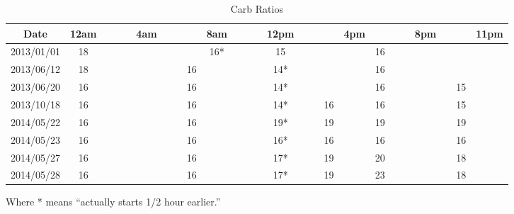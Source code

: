 \begin{table}[h]
\caption{Carb Ratios}
\footnotesize
\begin{center}
\begin{tabular}{|c|c|c|c|c|c|c|c|c|c|c|c|c|c|c|c|c|c|c|c|c|c|c|c|c|}
\hline
Date       & 12am & & & & 4am & & &    & 8am & & & & 12pm & & &    & 4pm &    & & & 8pm & &    & 11pm \\ \hline
2013/01/01 & 18   & & & &     & & &    & 16* & & & & 15   & & &    &     & 16 & & &     & &    &      \\
2013/06/12 & 18   & & & &     & & & 16 &     & & & & 14*  & & &    &     & 16 & & &     & &    &      \\
2013/06/20 & 16   & & & &     & & & 16 &     & & & & 14*  & & &    &     & 16 & & &     & & 15 &      \\
2013/10/18 & 16   & & & &     & & & 16 &     & & & & 14*  & & & 16 &     & 16 & & &     & & 15 &      \\
2014/05/22 & 16   & & & &     & & & 16 &     & & & & 19*  & & & 19 &     & 19 & & &     & & 19 &      \\
2014/05/23 & 16   & & & &     & & & 16 &     & & & & 16*  & & & 16 &     & 16 & & &     & & 16 &      \\
2014/05/27 & 16   & & & &     & & & 16 &     & & & & 17*  & & & 19 &     & 20 & & &     & & 18 &      \\
2014/05/28 & 16   & & & &     & & & 16 &     & & & & 17*  & & & 19 &     & 23 & & &     & & 18 &      \\
\hline
\end{tabular}
\end{center}
\label{default}
\end{table}%
Where * means ``actually starts 1/2 hour earlier.''

